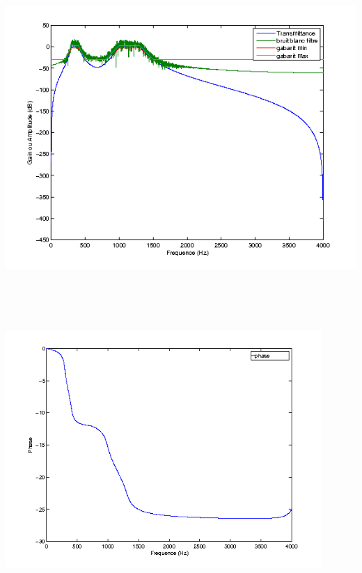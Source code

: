 \documentclass{article}
\begin{document}
\inputminted[linenos,lastline=25]{matlab}{RII_butter.m}
\includegraphics[height=13cm]{butt_1}
\inputminted[linenos,firstnumber=29,firstline=29,lastline=29]{matlab}{RII_butter.m}
\includegraphics[height=9cm]{butt_2}
\inputminted[linenos,firstnumber=34,firstline=34,lastline=43]{matlab}{RII_butter.m}
\end{document}
